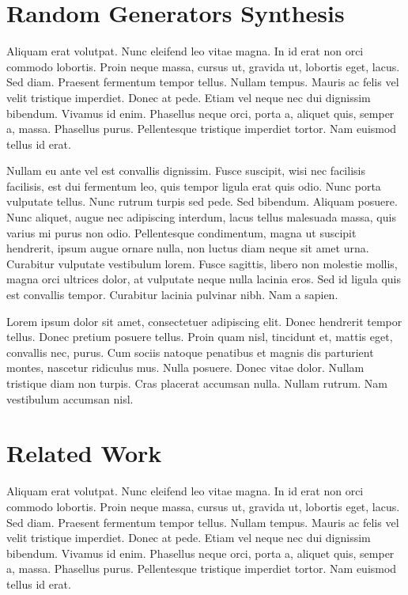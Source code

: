 \documentclass[conference]{IEEEtran}
\begin{document}

\section{Random Generators Synthesis} \label{sec:synthesis}

Aliquam erat volutpat. Nunc eleifend leo vitae magna. In id erat non orci
commodo lobortis. Proin neque massa, cursus ut, gravida ut, lobortis eget,
lacus. Sed diam. Praesent fermentum tempor tellus. Nullam tempus. Mauris ac
felis vel velit tristique imperdiet. Donec at pede. Etiam vel neque nec dui
dignissim bibendum. Vivamus id enim. Phasellus neque orci, porta a, aliquet
quis, semper a, massa. Phasellus purus. Pellentesque tristique imperdiet tortor.
Nam euismod tellus id erat.

Nullam eu ante vel est convallis dignissim. Fusce suscipit, wisi nec facilisis
facilisis, est dui fermentum leo, quis tempor ligula erat quis odio. Nunc porta
vulputate tellus. Nunc rutrum turpis sed pede. Sed bibendum. Aliquam posuere.
Nunc aliquet, augue nec adipiscing interdum, lacus tellus malesuada massa, quis
varius mi purus non odio. Pellentesque condimentum, magna ut suscipit hendrerit,
ipsum augue ornare nulla, non luctus diam neque sit amet urna. Curabitur
vulputate vestibulum lorem. Fusce sagittis, libero non molestie mollis, magna
orci ultrices dolor, at vulputate neque nulla lacinia eros. Sed id ligula quis
est convallis tempor. Curabitur lacinia pulvinar nibh. Nam a sapien.

Lorem ipsum dolor sit amet, consectetuer adipiscing elit. Donec hendrerit tempor
tellus. Donec pretium posuere tellus. Proin quam nisl, tincidunt et, mattis
eget, convallis nec, purus. Cum sociis natoque penatibus et magnis dis
parturient montes, nascetur ridiculus mus. Nulla posuere. Donec vitae dolor.
Nullam tristique diam non turpis. Cras placerat accumsan nulla. Nullam rutrum.
Nam vestibulum accumsan nisl.
\section{Related Work}

Aliquam erat volutpat. Nunc eleifend leo vitae magna. In id erat non orci
commodo lobortis. Proin neque massa, cursus ut, gravida ut, lobortis eget,
lacus. Sed diam. Praesent fermentum tempor tellus. Nullam tempus. Mauris ac
felis vel velit tristique imperdiet. Donec at pede. Etiam vel neque nec dui
dignissim bibendum. Vivamus id enim. Phasellus neque orci, porta a, aliquet
quis, semper a, massa. Phasellus purus. Pellentesque tristique imperdiet tortor.
Nam euismod tellus id erat.
\end{document}
